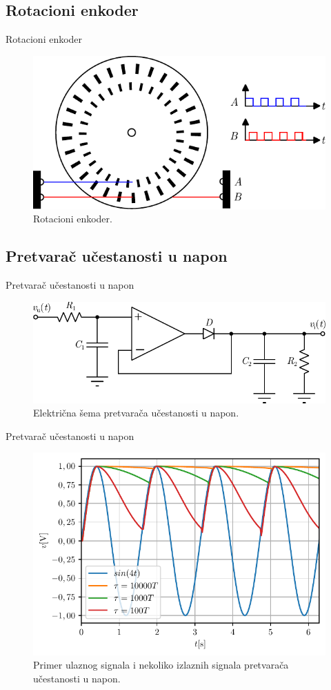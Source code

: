 \documentclass[aspectratio=169,xcolor=dvipsnames]{beamer}
\begin{document}
\subsection{Rotacioni enkoder}

\begin{frame}{Rotacioni enkoder}
    \begin{figure}
    \includegraphics[width=0.6\linewidth]{fig/enc.pdf}
    \caption{Rotacioni enkoder.}
    \end{figure}
\end{frame}


\subsection{Pretvarač učestanosti u napon}

\begin{frame}{Pretvarač učestanosti u napon}
    \begin{figure}
    \includegraphics[width=0.6\linewidth]{fig/fv.pdf}
    \caption{Električna šema pretvarača učestanosti u napon.}
    \end{figure}
\end{frame}



\begin{frame}{Pretvarač učestanosti u napon}
    \begin{figure}
    \includegraphics[width=0.6\linewidth]{fig/peakDet.pdf}
    \caption{Primer ulaznog signala i nekoliko izlaznih signala pretvarača učestanosti u napon.}
    \end{figure}
\end{frame}
\end{document}
